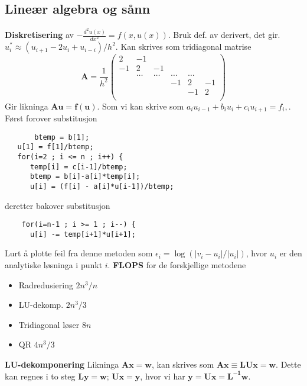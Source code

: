 \documentclass[12pt,a4paper,twocolumn]{article}
\begin{document}
\begin{flushleft}
\subsection{Lineær algebra og sånn} %
\label{sub:linalg}
\textbf{Diskretisering} av $-\frac{d^2u(x)}{dx^2} = f(x,u(x))$. Bruk def. av derivert, det gir. $u^{''}_i \approx  (u_{i+1} -2u_i +u_{i-i})/h^2.$ Kan skrives som tridiagonal matrise
\begin{equation*}
\mathbf{A} = \frac{1}{h^2}\left(\begin{array}{cccccc}
                          2 & -1 &  &   &  & \\
                          -1 & 2 & -1 & & & \\
                           & \dots   & \dots &\dots   &\dots & \\
                           &   &  &-1  &2& -1 \\
                           &    &  &   &-1 & 2 \\
                      \end{array} \right)	
\end{equation*}
Gir likninga $\mathbf{A}\mathbf{u} = \mathbf{f}(\mathbf{u}).$ Som vi kan skrive som $a_iu_{i-1}+b_iu_i+c_iu_{i+1} = f_i,$. Først forover substitusjon
\begin{verbatim}
	   btemp = b[1];
   u[1] = f[1]/btemp;
   for(i=2 ; i <= n ; i++) {
      temp[i] = c[i-1]/btemp;
      btemp = b[i]-a[i]*temp[i];
      u[i] = (f[i] - a[i]*u[i-1])/btemp;
\end{verbatim}
deretter bakover substitusjon
\begin{verbatim}
	for(i=n-1 ; i >= 1 ; i--) {
      u[i] -= temp[i+1]*u[i+1];
\end{verbatim}
Lurt å plotte feil fra denne metoden som $\epsilon_i = \log(|v_i-u_i|/|u_i|)$, hvor $u_i$ er den analytiske løsninga i punkt $i$.
\textbf{FLOPS} for de forskjellige metodene
\begin{itemize}
	\item Radredusiering $2n^3/n$
	\item LU-dekomp. $2n^3/3$
	\item Tridiagonal løser $8n$ 
	\item QR $4n^3/3$
\end{itemize}
\textbf{LU-dekomponering} Likninga $\mathbf{Ax}=\mathbf{w}$, kan skrives som $\mathbf{A} \mathbf{x} \equiv \mathbf{L} \mathbf{U} \mathbf{x} =\mathbf{w}$. Dette kan regnes i to steg $\mathbf{L} \mathbf{y} = \mathbf{w};\, \mathbf{Ux}=\mathbf{y}$, hvor vi har $\mathbf{y}=\mathbf{Ux}=\mathbf{L^{-1}w}$.\\

\end{flushleft}
\end{document}
